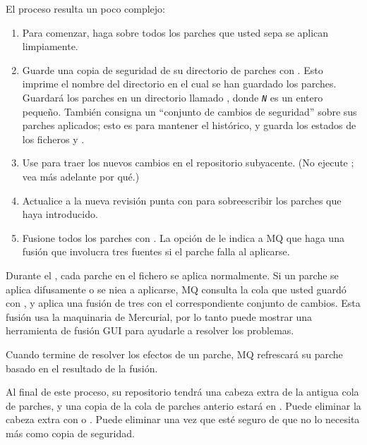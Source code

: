 El proceso resulta un poco complejo:
\begin{enumerate}
\item Para comenzar, haga  sobre todos los
  parches que usted sepa se aplican limpiamente.
\item Guarde una copia de seguridad de su directorio de parches  con
  .
  Esto imprime el nombre del directorio en el cual se han guardado los
  parches.  Guardará los parches en un directorio llamado
  , donde \texttt{\emph{N}} es un
  entero pequeño.  También consigna un ``conjunto de cambios de
  seguridad'' sobre sus parches aplicados; esto es para mantener el
  histórico, y guarda los estados de los ficheros  
  y .
\item Use  para traer los nuevos cambios en el repositorio
  subyacente. (No ejecute ; vea más adelante por qué.)
\item Actualice a la nueva revisión punta con 
   para sobreescribir los
  parches que haya introducido.
\item Fusione todos los parches con .  La opción  de 
  le indica a MQ que haga una fusión que involucra tres fuentes si el
  parche falla al aplicarse.
\end{enumerate}

Durante el , cada parche en
el fichero  se aplica normalmente.  Si un parche se
aplica difusamente o se niea a aplicarse, MQ consulta la cola que
usted guardó con , y aplica una fusión de tres con
el correspondiente conjunto de cambios.  Esta fusión usa la maquinaria
de Mercurial, por lo tanto puede mostrar una herramienta de fusión GUI
para ayudarle a resolver los problemas.

Cuando termine de resolver los efectos de un parche, MQ refrescará su
parche basado en el resultado de la fusión.

Al final de este proceso, su repositorio tendrá una cabeza extra de la
antigua cola de parches, y una copia de la cola de parches anterio
estará en . Puede eliminar la cabeza
extra con 
o .  Puede eliminar  una
vez que esté seguro de que no lo necesita más como copia de seguridad.

